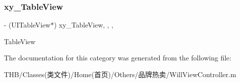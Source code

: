 \subsubsection{\texorpdfstring{xy\+\_\+\+Table\+View}{xy\_TableView}}
{\footnotesize\ttfamily -\/ (U\+I\+Table\+View$\ast$) xy\+\_\+\+Table\+View\hspace{0.3cm}{\ttfamily [read]}, {\ttfamily [write]}, {\ttfamily [nonatomic]}, {\ttfamily [strong]}}

Table\+View 

The documentation for this category was generated from the following file\+:\begin{DoxyCompactItemize}
\item 
T\+H\+B/\+Classes(类文件)/\+Home(首页)/\+Others/品牌热卖/Will\+View\+Controller.\+m\end{DoxyCompactItemize}
